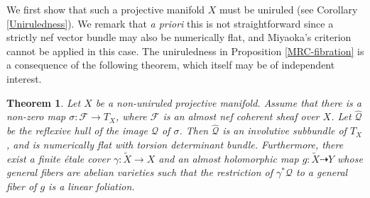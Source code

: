 \documentclass[english,reqno]{amsart}
\newcommand\sF{{\mathscr F}}
\newcommand\sQ{{\mathscr Q}}
\theoremstyle{plain}
\newtheorem{thm}{Theorem}[section]
\theoremstyle{definition}
\numberwithin{equation}{section} %
\begin{document}
We  first show that such a projective manifold $X$ must be uniruled (see Corollary \ref{Uniruledness}). We remark that \emph{a priori} this is not straightforward since a strictly nef vector bundle may also be numerically flat, and Miyaoka's criterion cannot be applied in this case.
The uniruledness in Proposition \ref{MRC-fibration}  is  a consequence of the following theorem, which itself may be of independent interest.



\begin{thm}\label{Almost-nef-non-uniruled}
    Let $X$ be a non-uniruled projective manifold. Assume that there is a non-zero map $\sigma\colon \sF\rightarrow T_X$, where $\sF$ is an almost nef coherent sheaf over  $X$. Let $\widehat{\sQ}$ be the reflexive hull of the image $\sQ$ of $\sigma$. Then $\widehat{\sQ}$ is an involutive subbundle of $T_X$, and  is numerically flat  with torsion determinant bundle. Furthermore, there exist a finite \'etale cover  $\gamma\colon \widetilde{X}\rightarrow X$ and an almost holomorphic map $g\colon \widetilde{X}\dashrightarrow Y$ whose general fibers are   abelian varieties such that the restriction of $\gamma^*\widehat{\sQ}$ to a general fiber of $g$ is a linear foliation.
\end{thm}
\end{document}

